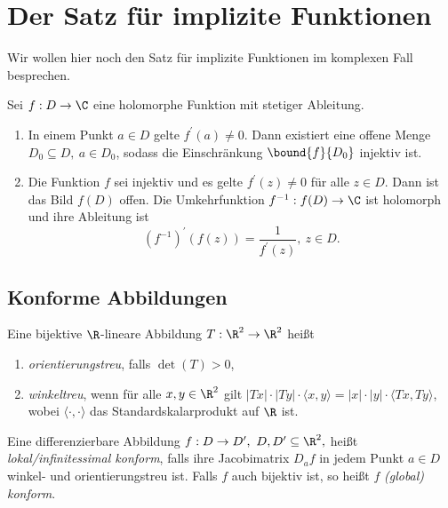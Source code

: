 \section{Der Satz für implizite Funktionen}\lecture
		
		Wir wollen hier noch den Satz für implizite Funktionen im komplexen Fall besprechen.
		
		\begin{thm}
			Sei $ f: D \to \C $ eine holomorphe Funktion mit stetiger Ableitung.
			\begin{enumerate}[label={\alph*})]
				\item In einem Punkt $a \in D$ gelte $ f^\prime(a) \neq 0 $. Dann existiert eine offene Menge $ D_0 \subseteq D,\ a \in D_0 $, sodass die Einschränkung $ \bound{f}{D_0} $ injektiv ist.
				\item Die Funktion $f$ sei injektiv und es gelte $ f^\prime(z) \neq 0 $ für alle $z \in D$. Dann ist das Bild $f(D)$ offen. Die Umkehrfunktion $ f^{-1}: f(D) \to \C $ ist holomorph und ihre Ableitung ist 
				$$ \left(f^{-1}\right)^\prime (f(z)) = \frac{1}{f^\prime(z)},\ z \in D. $$
			\end{enumerate}
		\end{thm}
		
		\subsection*{Konforme Abbildungen}
		
		\begin{defn}
			Eine bijektive $\R$-lineare Abbildung $ T: \R^2 \to \R^2 $ heißt
			\begin{enumerate}[label={\alph*})]
				\item \emph{orientierungstreu}, falls $\det(T)>0$,
				\item \emph{winkeltreu}, wenn für alle $x,y \in \R^2$ gilt $ |Tx|\cdot |Ty| \cdot \langle x,y\rangle = |x| \cdot |y|\cdot \langle Tx,Ty \rangle $, wobei $\langle\cdot ,\cdot \rangle$ das Standardskalarprodukt auf $\R$ ist.
			\end{enumerate}
		\end{defn}
		
		\begin{defn}[Konformität]
			Eine differenzierbare Abbildung $ f:D \to D^\prime,\ D,D^\prime \subseteq \R^2, $ heißt \emph{lokal/infinitessimal konform}, falls ihre Jacobimatrix $ D_af $ in jedem Punkt $a \in D$ winkel- und orientierungstreu ist. Falls $f$ auch bijektiv ist, so heißt $f$ \emph{(global) konform}.
		\end{defn}
		
